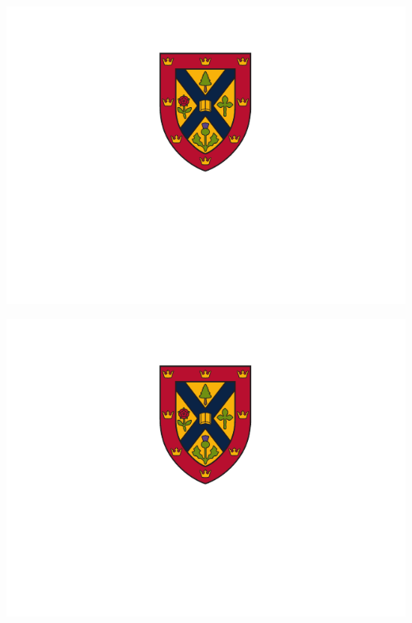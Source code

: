 \documentclass[fleqn]{qu-slides}
\begin{document}
\SlideBlue 
\begin{frame}
    \centering
    \includegraphics[height=0.9\textheight]{logo/qu-logo-vertical-reverse.pdf}
\end{frame}


\SlideRed
\begin{frame}
    \centering
    \includegraphics[height=0.9\textheight]{logo/qu-logo-vertical-reverse.pdf}
\end{frame}

\end{document}
